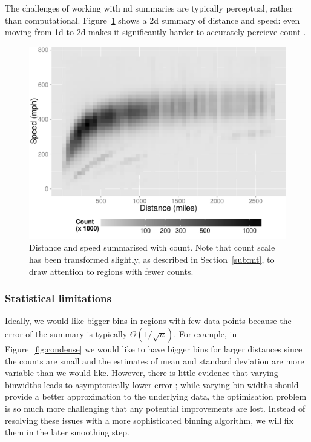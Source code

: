 \documentclass[journal]{vgtc}                %
\begin{document}
The challenges of working with nd summaries are typically perceptual, rather than computational. Figure~\ref{fig:condense-2d} shows a 2d summary of distance and speed: even moving from 1d to 2d makes it significantly harder to accurately percieve count \citep{cleveland:1984}.

\begin{figure}[htb]
 \centering
 \includegraphics[width=\linewidth]{condense-2d}
 \caption{Distance and speed summarised with count. Note that count scale has been transformed slightly, as described in Section~\ref{sub:mt}, to draw attention to regions with fewer counts.}
 \label{fig:condense-2d}
\end{figure}

\subsubsection{Statistical limitations}

Ideally, we would like bigger bins in regions with few data points because the error of the summary is typically $\Theta(1 / \sqrt{n})$. For example, in Figure~\ref{fig:condense} we would like to have bigger bins for larger distances since the counts are small and the estimates of mean and standard deviation are more variable than we would like. However, there is little evidence that varying binwidths leads to asymptotically lower error \citep{terrell:1992}; while varying bin widths should provide a better approximation to the underlying data, the optimisation problem is so much more challenging that any potential improvements are lost. Instead of resolving these issues with a more sophisticated binning algorithm, we will fix them in the later smoothing step.  
\end{document}
